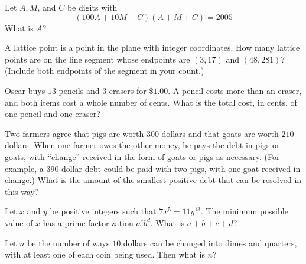 \documentclass{article}
\begin{document}
\begin{prob}[AMC 12A 2005/8]{2}

Let $A,M$, and $C$ be digits with
\[(100A+10M+C)(A+M+C) = 2005\]
What is $A$?

\end{prob}

\begin{prob}[AHSME 1989/16]{2}

A lattice point is a point in the plane with integer coordinates. How many lattice points are on the line segment whose endpoints are $(3,17)$ and $(48,281)$? (Include both endpoints of the segment in your count.)

\end{prob}

\begin{prob}[AMC 12A 2006/9]{2}

Oscar buys $13$ pencils and $3$ erasers for $\$1.00$. A pencil costs more than an eraser, and both items cost a whole number of cents. What is the total cost, in cents, of one pencil and one eraser?

\end{prob}

\begin{prob}[AMC 12A 2006/14]{3}

Two farmers agree that pigs are worth $300$ dollars and that goats are worth $210$ dollars. When one farmer owes the other money, he pays the debt in pigs or goats, with ``change'' received in the form of goats or pigs as necessary. (For example, a $390$ dollar debt could be paid with two pigs, with one goat received in change.) What is the amount of the smallest positive debt that can be resolved in this way?

\end{prob}

\begin{prob}[AMC 12B 2003/18]{3}

Let $x$ and $y$ be positive integers such that $7x^5=11y^{13}$. The minimum possible value of $x$ has a prime factorization $a^c b^d$. What is $a+b+c+d$?

\end{prob}

\begin{prob}[AHSME 1968/19]{3}

Let $n$ be the number of ways $10$ dollars can be changed into dimes and quarters, with at least one of each coin being used. Then what is $n$?

\end{prob}
\end{document}
